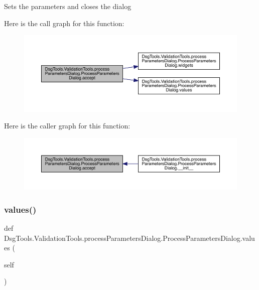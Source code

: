 \begin{DoxyVerb}Sets the parameters and closes the dialog
\end{DoxyVerb}
 Here is the call graph for this function\+:
\nopagebreak
\begin{figure}[H]
\begin{center}
\leavevmode
\includegraphics[width=350pt]{class_dsg_tools_1_1_validation_tools_1_1process_parameters_dialog_1_1_process_parameters_dialog_af98151fb4552234e3d92e0e4b4bdea73_cgraph}
\end{center}
\end{figure}
Here is the caller graph for this function\+:
\nopagebreak
\begin{figure}[H]
\begin{center}
\leavevmode
\includegraphics[width=350pt]{class_dsg_tools_1_1_validation_tools_1_1process_parameters_dialog_1_1_process_parameters_dialog_af98151fb4552234e3d92e0e4b4bdea73_icgraph}
\end{center}
\end{figure}
\mbox{\label{class_dsg_tools_1_1_validation_tools_1_1process_parameters_dialog_1_1_process_parameters_dialog_ac16e1fb8ce02551da4ccb5bcc632f63b}} 
\subsubsection{\texorpdfstring{values()}{values()}}
{\footnotesize\ttfamily def Dsg\+Tools.\+Validation\+Tools.\+process\+Parameters\+Dialog.\+Process\+Parameters\+Dialog.\+values (\begin{DoxyParamCaption}\item[{}]{self }\end{DoxyParamCaption})}

